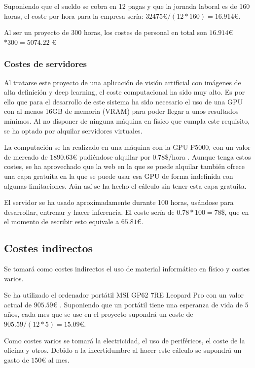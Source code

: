 Suponiendo que el sueldo se cobra en 12 pagas y que la jornada laboral es de 160 horas, el coste por hora para la empresa sería: $32475 $€$ / (12 * 160) = 16.914$€.

Al ser un proyecto de 300 horas, los costes de personal en total son $16.914 $€$ * 300 = 5074.22 $ €

\subsubsection{Costes de servidores}\label{subsec:servidores}

Al tratarse este proyecto de una aplicación de visión artificial con imágenes de alta definición y deep learning, el coste computacional ha sido muy alto. Es por ello que para el desarrollo de este sistema ha sido necesario el uso de una GPU con al menos 16GB de memoria (VRAM) para poder llegar a unos resultados mínimos. Al no disponer de ninguna máquina en físico que cumpla este requisito, se ha optado por alquilar servidores virtuales.

La computación se ha realizado en una máquina con la GPU P5000, con un valor de mercado de $1890.63$€ \cite{amazonp5000} pudiéndose alquilar por $0.78$\$/hora \cite{gradientdocs}. Aunque tenga estos costes, se ha aprovechado que la web en la que se puede alquilar también ofrece una capa gratuita en la que se puede usar esa GPU de forma indefinida con algunas limitaciones. Aún así se ha hecho el cálculo sin tener esta capa gratuita.

El servidor se ha usado aproximadamente durante 100 horas, usándose para desarrollar, entrenar y hacer inferencia. El coste sería de $0.78 * 100 = 78$\$, que en el momento de escribir esto equivale a $65.81$€.

\subsection{Costes indirectos}\label{sec:costesindirectos}

Se tomará como costes indirectos el uso de material informático en físico y costes varios.

Se ha utilizado el ordenador portátil MSI GP62 7RE Leopard Pro con un valor actual de $905.59$€ \cite{pccomponentes}. Suponiendo que un portátil tiene una esperanza de vida de 5 años, cada mes que se use en el proyecto supondrá un coste de $905.59 / (12*5) = 15.09$€.

Como costes varios se tomará la electricidad, el uso de periféricos, el coste de la oficina y otros. Debido a la incertidumbre al hacer este cálculo se supondrá un gasto de $150$€ al mes.

